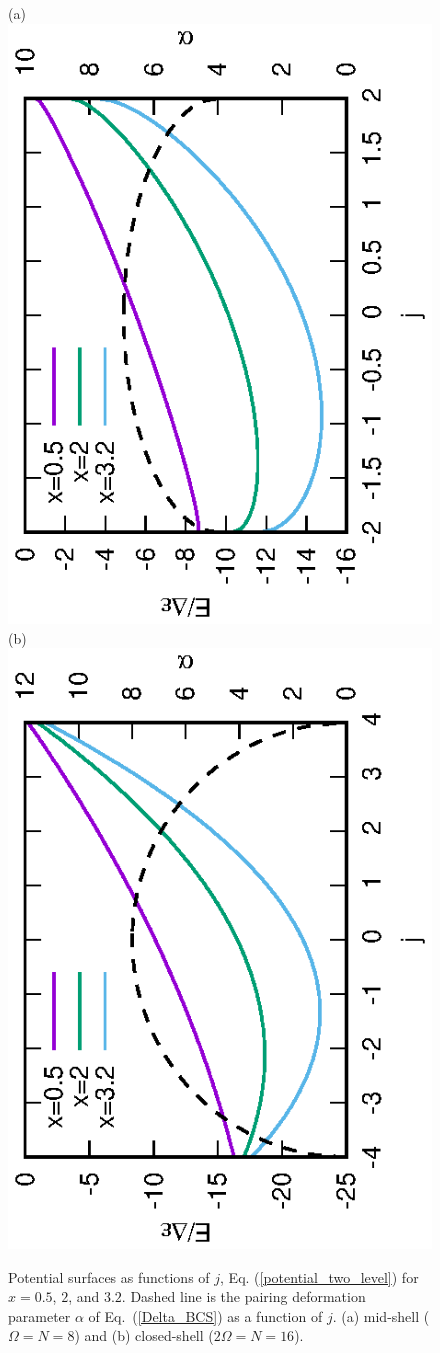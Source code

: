 \documentclass[11pt]{book} %
\begin{document}
\begin{figure}[tb]
 \begin{center}
(a) \includegraphics[height=0.44\textwidth,angle=-90]{images/N8p_E.eps}
(b) \includegraphics[height=0.44\textwidth,angle=-90]{images/N16p_E.eps}
 \end{center}
 \caption{Potential surfaces as functions of $j$,
 Eq. (\ref{potential_two_level}) for $x=0.5$, $2$, and $3.2$.
 Dashed line is the pairing deformation parameter $\alpha$
 of Eq.~(\ref{Delta_BCS}) as a function of $j$.
 (a) mid-shell ($\Omega=N=8$) and (b) closed-shell ($2\Omega=N=16$).
}
 \label{fig:p_Delta}
\end{figure}
\end{document}
